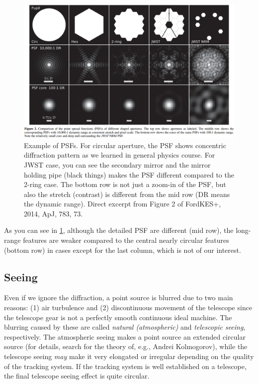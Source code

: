 \begin{figure} [htb!]
	\centering
	\includegraphics[width=0.9\linewidth]{figs/psf_telescopes}
	\caption{Example of PSFs. For circular aperture, the PSF shows concentric diffraction pattern as we learned in general physics course. For JWST case, you can see the secondary mirror and the mirror holding pipe (black things) makes the PSF different compared to the 2-ring case. The bottom row is not just a zoom-in of the PSF, but also the stretch (contrast) is different from the mid row (DR means the dynamic range). Direct excerpt from Figure 2 of FordKES+, 2014, ApJ, 783, 73.}
	\label{fig:psftelescopes}
\end{figure}

As you can see in \cref{fig:psftelescopes}, although the detailed PSF are different (mid row), the long-range features are weaker compared to the central nearly circular features (bottom row) in cases except for the last column, which is not of our interest. 


\subsection{Seeing}

Even if we ignore the diffraction, a point source is blurred due to two main reasons: (1) air turbulence and (2) discontinuous movement of the telescope since the telescope gear is not a perfectly smooth continuous ideal machine. The blurring caused by these are called \textit{natural (atmospheric)} and \textit{telescopic seeing}, respectively. The atmospheric seeing makes a point source an extended circular source (for details, search for the theory of, e.g., Andrei Kolmogorov), while the telescope seeing \textit{may} make it very elongated or irregular depending on the quality of the tracking system. If the tracking system is well established on a telescope, the final telescope seeing effect is quite circular. 

